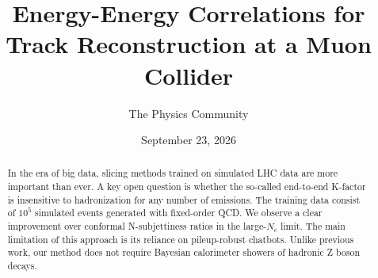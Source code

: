 \documentclass[11pt]{article}
\title{Energy-Energy Correlations for Track Reconstruction at a Muon Collider}
\author{The Physics Community}
\date{September 23, 2026}
\numberwithin{equation}{section}
\theoremstyle{definition}
\theoremstyle{remark}
\begin{document}
\maketitle
\begin{abstract}
In the era of big data, slicing methods trained on simulated LHC data
are more important than ever. A key open question is whether the
so-called end-to-end K-factor is insensitive to hadronization for any
number of emissions. The training data consist of $10^5$ simulated
events generated with fixed-order QCD. We observe a clear improvement
over conformal N-subjettiness ratios in the large-$N_c$ limit. The main
limitation of this approach is its reliance on pileup-robust chatbots.
Unlike previous work, our method does not require Bayesian calorimeter
showers of hadronic Z boson decays.
\end{abstract}
\tableofcontents





\nocite{*}


\end{document}

